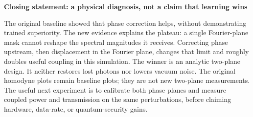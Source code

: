 \documentclass[11pt,letterpaper]{article}
\newcommand{\cue}[1]{\par\textbf{#1}\par}
\begin{document}
\cue{Closing statement: a physical diagnosis, not a claim that learning wins}
The original baseline showed that phase correction helps, without demonstrating trained superiority. The new evidence explains the plateau: a single Fourier-plane mask cannot reshape the spectral magnitudes it receives. Correcting phase upstream, then displacement in the Fourier plane, changes that limit and roughly doubles useful coupling in this simulation. The winner is an analytic two-plane design. It neither restores lost photons nor lowers vacuum noise. The original homodyne plots remain baseline plots; they are not new two-plane measurements. The useful next experiment is to calibrate both phase planes and measure coupled power and transmission on the same perturbations, before claiming hardware, data-rate, or quantum-security gains.
\end{document}
